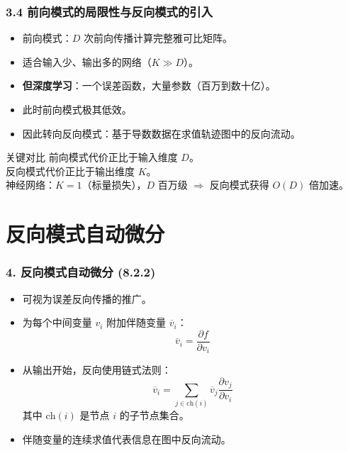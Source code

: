 \documentclass[t,aspectratio=169]{beamer} %
\begin{document}
\begin{frame}
    \frametitle{3.4 前向模式的局限性与反向模式的引入}
    \begin{itemize}
        \item 前向模式：$D$ 次前向传播计算完整雅可比矩阵。
        \item 适合\alert{输入少、输出多}的网络（$K \gg D$）。
        \item \textbf{但深度学习}：一个误差函数，大量参数（百万到数十亿）。
        \item 此时前向模式\alert{极其低效}。
        \item 因此转向\alert{反向模式}：基于导数数据在求值轨迹图中的\alert{反向流动}。
    \end{itemize}
    \begin{block}{关键对比}
        前向模式代价正比于\alert{输入维度 $D$}。\\
        反向模式代价正比于\alert{输出维度 $K$}。\\
        神经网络：$K=1$（标量损失），$D$ 百万级 $\Rightarrow$ 反向模式获得 $O(D)$ 倍加速。
    \end{block}
\end{frame}

\section{反向模式自动微分}

\begin{frame}
    \frametitle{4. 反向模式自动微分 (8.2.2)}
    \begin{itemize}
        \item 可视为\alert{误差反向传播的推广}。
        \item 为每个中间变量 $v_i$ 附加\alert{伴随变量} $\overline{v}_i$：
        \begin{equation}
            \overline{v}_i = \frac{\partial f}{\partial v_i}
            \tag{8.68}
        \end{equation}
        \item 从输出开始，反向使用链式法则：
        \begin{equation}
            \overline{v}_i = \sum_{j \in \mathrm{ch}(i)} \overline{v}_j \frac{\partial v_j}{\partial v_i}
            \tag{8.69}
        \end{equation}
        其中 $\mathrm{ch}(i)$ 是节点 $i$ 的\alert{子节点}集合。
        \item 伴随变量的连续求值代表信息在图中\alert{反向流动}。
    \end{itemize}
\end{frame}
\end{document}
